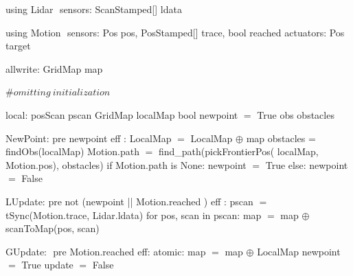 using Lidar $\label{lidardef}$
    sensors:
       ScanStamped[] ldata

using Motion $\label{moddef}$
    sensors:
        Pos pos,
        PosStamped[] trace,
        bool reached
    actuators:
        Pos target

allwrite:$\label{awvar}$
    GridMap map

#$\mathit{omitting\ initialization}$

local:
   posScan pscan
   GridMap localMap
   bool newpoint $=$ True
   obs obstacles

NewPoint:$\label{newpt}$
  pre newpoint
  eff : LocalMap $=$ LocalMap $\oplus$ map
        obstacles = findObs(localMap)
        Motion.path $=$ find_path(pickFrontierPos(
                              localMap, Motion.pos), obstacles)
        if Motion.path is None:
           newpoint $=$ True
        else:
           newpoint $=$ False

LUpdate:$\label{lup}$
   pre not (newpoint || Motion.reached )
   eff : pscan $=$ tSync(Motion.trace, Lidar.ldata)
         for pos, scan in pscan:
             map $=$ map $\oplus$ scanToMap(pos, scan)

GUpdate: $\label{gup}$
  pre Motion.reached
  eff: atomic:
           map $=$ map $\oplus$ LocalMap
        newpoint $=$ True
        update $=$ False